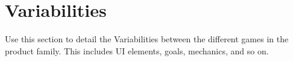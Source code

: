 \section{Variabilities}

Use this section to detail the Variabilities between the different games in the product family. This includes UI elements, goals, mechanics, and so on.